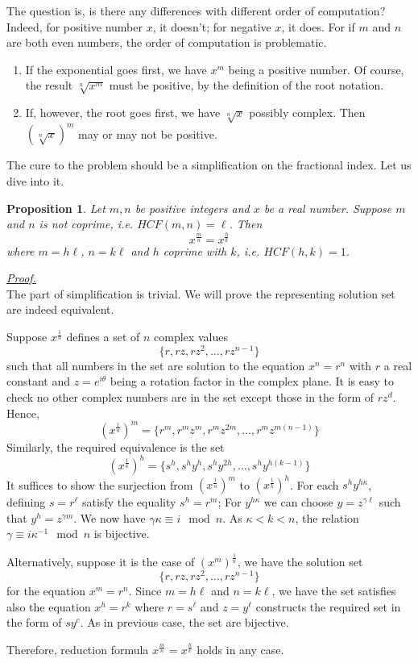\documentclass[12pt]{article}
\newtheorem*{proposition}{Proposition}
\renewenvironment{proof}[1][Proof]{\begin{snugshade*} \underline{\textit{{#1}.}}\\}{\hfill \qedsymbol \end{snugshade*}}
\begin{document}
    The question is, is there any differences with different order of computation? Indeed, for positive number $x$, it doesn't; for negative $x$, it does. For if $m$ and $n$ are both even numbers, the order of computation is problematic.\begin{enumerate}
        \item If the exponential goes first, we have $x^m$ being a positive number. Of course, the result $\sqrt[n]{x^m}$ must be positive, by the definition of the root notation.
        \item If, however, the root goes first, we have $\sqrt[n]{x}$ possibly complex. Then $(\sqrt[n]{x})^m$ may or may not be positive.
    \end{enumerate}

    The cure to the problem should be a simplification on the fractional index. Let us dive into it.

    \begin{proposition}
        Let $m,n$ be positive integers and $x$ be a real number. Suppose $m$ and $n$ is not coprime, i.e. $HCF(m,n)=\ell$. Then $$x^{\frac{m}{n}}=x^{\frac{h}{k}}$$ where $m=h\ell$, $n=k\ell$ and $h$ coprime with $k$, i.e. $HCF(h,k)=1$.
    \end{proposition}

    \begin{proof}
        The part of simplification is trivial. We will prove the representing solution set are indeed equivalent.

        Suppose $x^{\frac{1}{n}}$ defines a set of $n$ complex values $$\{r,rz,rz^2,\dots,rz^{n-1}\}$$ such that all numbers in the set are solution to the equation $x^n=r^n$ with $r$ a real constant and $z=e^{i\theta}$ being a rotation factor in the complex plane. It is easy to check no other complex numbers are in the set except those in the form of $rz^d$. Hence, $$(x^{\frac{1}{n}})^m=\{r^m, r^m z^m, r^m z^{2m}, \dots, r^m z^{m(n-1)}\}$$
        Similarly, the required equivalence is the set $$(x^{\frac{1}{k}})^h=\{s^h, s^h y^h, s^h y^{2h}, \dots, s^h y^{h(k-1)}\}$$
        It suffices to show the surjection from $(x^{\frac{1}{n}})^m$ to $(x^{\frac{1}{k}})^h$. For each $s^h y^{h\kappa}$, defining $s=r^\ell$ satisfy the equality $s^h=r^m$; For $y^{h\kappa}$ we can choose $y=z^{\gamma\ell}$ such that $y^h=z^{\gamma m}$. We now have $\gamma\kappa \equiv i \mod n$. As $\kappa < k < n$, the relation $\gamma \equiv i \kappa^{-1} \mod n$ is bijective.

        Alternatively, suppose it is the case of $(x^m)^{\frac{1}{n}}$, we have the solution set $$\{r, rz, rz^2, \dots, rz^{n-1}\}$$ for the equation $x^m=r^n$. Since $m=h\ell$ and $n=k\ell$, we have the set satisfies also the equation $x^h=r^k$ where $r=s^\ell$ and $z=y^\ell$ constructs the required set in the form of $sy^c$. As in previous case, the set are bijective.
        
        Therefore, reduction formula $x^{\frac{m}{n}}=x^{\frac{h}{k}}$ holds in any case.
    \end{proof}
\end{document}
